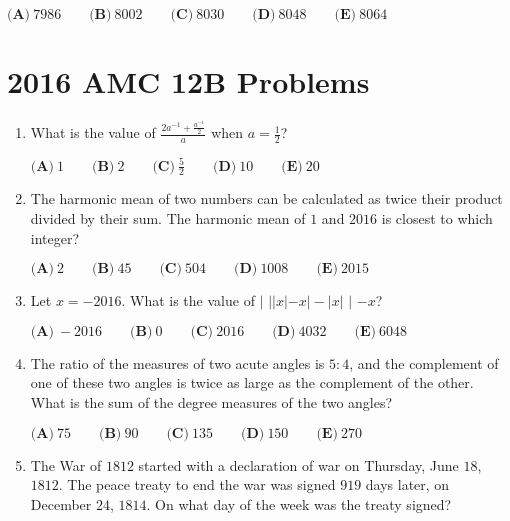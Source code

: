 \documentclass{article}
\begin{document}
\begin{enumerate}[label=\arabic*., itemsep=0.5em]
\(\textbf{(A)}\ 7986\qquad\textbf{(B)}\ 8002\qquad\textbf{(C)}\ 8030\qquad\textbf{(D)}\ 8048\qquad\textbf{(E)}\ 8064\)\par \vspace{0.5em}\end{enumerate}\newpage\section*{2016 AMC 12B Problems}
\begin{enumerate}[label=\arabic*., itemsep=0.5em]\item What is the value of \(\frac{2a^{-1}+\frac{a^{-1}}{2}}{a}\) when \(a= \frac{1}{2}\)?

\(\textbf{(A)}\ 1\qquad\textbf{(B)}\ 2\qquad\textbf{(C)}\ \frac{5}{2}\qquad\textbf{(D)}\ 10\qquad\textbf{(E)}\ 20\)\par \vspace{0.5em}\item The harmonic mean of two numbers can be calculated as twice their product divided by their sum. The harmonic mean of \(1\) and \(2016\) is closest to which integer?

\(\textbf{(A)}\ 2 \qquad
\textbf{(B)}\ 45 \qquad
\textbf{(C)}\ 504 \qquad
\textbf{(D)}\ 1008 \qquad
\textbf{(E)}\ 2015 \)\par \vspace{0.5em}\item Let \(x=-2016\). What is the value of \(\bigg|\) \(||x|-x|-|x|\) \(\bigg|\) \(-x\)?

\(\textbf{(A)}\ -2016\qquad\textbf{(B)}\ 0\qquad\textbf{(C)}\ 2016\qquad\textbf{(D)}\ 4032\qquad\textbf{(E)}\ 6048\)\par \vspace{0.5em}\item The ratio of the measures of two acute angles is \(5:4\), and the complement of one of these two angles is twice as large as the complement of the other. What is the sum of the degree measures of the two angles?

\(\textbf{(A)}\ 75\qquad\textbf{(B)}\ 90\qquad\textbf{(C)}\ 135\qquad\textbf{(D)}\ 150\qquad\textbf{(E)}\ 270\)\par \vspace{0.5em}\item The War of \(1812\) started with a declaration of war on Thursday, June \(18\), \(1812\). The peace treaty to end the war was signed \(919\) days later, on December \(24\), \(1814\). On what day of the week was the treaty signed? 


\end{enumerate}
\end{document}
